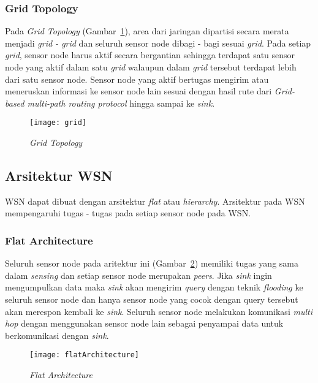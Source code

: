 \subsubsection{Grid Topology}
Pada {\it Grid Topology} (Gambar~\ref{fig:grid}), area dari jaringan dipartisi secara merata menjadi {\it grid - grid} dan seluruh sensor node dibagi - bagi sesuai {\it grid}. Pada setiap {\it grid}, sensor node harus aktif secara bergantian sehingga terdapat satu sensor node yang aktif dalam satu {\it grid} walaupun dalam {\it grid} tersebut terdapat lebih dari satu sensor node. Sensor node yang aktif bertugas mengirim atau meneruskan informasi ke sensor node lain sesuai dengan hasil rute dari {\it Grid-based multi-path routing protocol} hingga sampai ke {\it sink}.
\begin{figure} [H]
	\centering  
	\texttt{[image: grid]}  
	\caption[{\it Grid Topology}]{{\it Grid Topology}} 
	\label{fig:grid} 
\end{figure} 

\subsection{Arsitektur WSN \cite{jun:0:wsnpers}}
\label{subsec:arch}
WSN dapat dibuat dengan arsitektur {\it flat} atau {\it hierarchy}. Arsitektur pada WSN mempengaruhi tugas - tugas pada setiap sensor node pada WSN. 

\subsubsection{Flat Architecture}
\label{subsubsec:flatArch}
Seluruh sensor node pada aritektur ini (Gambar~\ref{fig:flatArchitecture}) memiliki tugas yang sama dalam {\it sensing} dan setiap sensor node merupakan {\it peers}. Jika {\it sink} ingin mengumpulkan data maka {\it sink} akan mengirim {\it query} dengan teknik {\it flooding} ke seluruh sensor node dan hanya sensor node yang cocok dengan query tersebut akan merespon kembali ke {\it sink}. Seluruh sensor node melakukan komunikasi {\it multi hop} dengan menggunakan sensor node lain sebagai penyampai data untuk berkomunikasi dengan {\it sink}.
\begin{figure} [H]
	\centering  
	\texttt{[image: flatArchitecture]}  
	\caption[{\it Flat Architecture}]{{\it Flat Architecture}} 
	\label{fig:flatArchitecture} 
\end{figure} 

